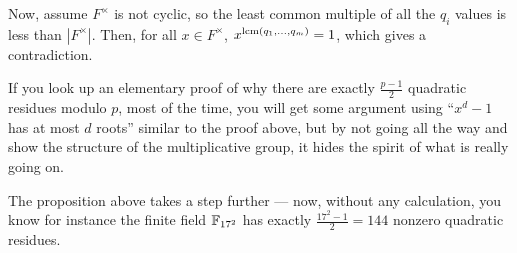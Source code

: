 Now, assume $F^\times$ is not cyclic, so the least common multiple of all the $q_i$ values is
less than $|F^\times|$.
Then, for all $x \in F^\times$, $x^{\operatorname*{lcm}(q_1, \dots, q_m)} = 1$, which gives a contradiction.

\begin{remark}
	If you look up an elementary proof of why there are exactly $\frac{p-1}{2}$ quadratic residues modulo $p$,
	most of the time, you will get some argument using ``$x^d-1$ has at most $d$ roots'' similar to
	the proof above, but by not going all the way and show the structure of the multiplicative
	group, it hides the spirit of what is really going on.

	The proposition above takes a step further --- now, without any calculation, you know
	for instance the finite field $\mathbb F_{17^2}$ has exactly $\frac{17^2-1}{2} = 144$ nonzero
	quadratic residues.
\end{remark}

